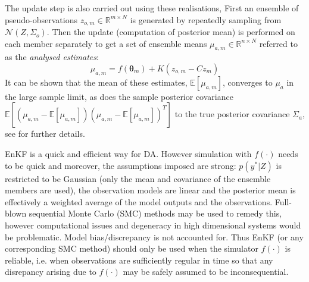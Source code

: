 \documentclass[10pt,a4paper]{article}
\newcommand{\expect} {{\mathbb{E}}}
\newcommand{\thetab} {{\boldsymbol{\theta}}}
\begin{document}
The update step is also carried out using these realisations, First an ensemble of pseudo-observations $z_{o,m} \in \mathbb{R}^{m \times N}$ is generated by repeatedly sampling from $\mathcal{N}(Z,\Sigma_o)$. Then the update (computation of posterior mean) is performed on each member separately to get a set of ensemble means $\mu_{a,m} \in \mathbb{R}^{n \times N}$ referred to as the \emph{analysed estimates}:
\begin{equation}
\mu_{a,m} = f(\thetab_m) + K(z_{o,m} - Cz_m)
\end{equation}
It can be shown that the mean of these estimates, $\expect[\mu_{a,m}]$, converges to $\mu_a$ in the large sample limit, as does the sample posterior covariance $\expect[(\mu_{a,m} - \expect[\mu_{a,m}])(\mu_{a,m} - \expect[\mu_{a,m}])^T]$ to the true posterior covariance $\Sigma_a$, see \cite{Burgers_1998} for further details.

EnKF is a quick and efficient way for DA. However simulation with $f(\cdot)$ needs to be quick and moreover, the assumptions imposed are strong: $p(y^* | Z)$ is restricted to be Gaussian (only the mean and covariance of the ensemble members are used), the observation models are linear and the posterior mean is effectively a weighted average of the model outputs and the observations. Full-blown sequential Monte Carlo (SMC) methods may be used to remedy this, however computational issues and degeneracy in high dimensional systems would be problematic. Model bias/discrepancy is not accounted for. Thus EnKF (or any corresponding SMC method) should only be used when the simulator $f(\cdot)$ is reliable, i.e. when observations are sufficiently regular in time so that any disrepancy arising due to $f(\cdot)$ may be safely assumed to be inconsequential.
\end{document}
